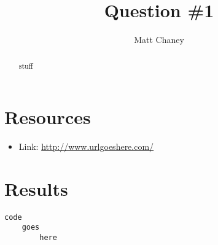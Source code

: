 \documentclass[10pt,letterpaper]{article}
\begin{document}
\lstset{language=Python, basicstyle=\small}

\title{Question \#1}
\author{Matt Chaney}

\maketitle

\begin{abstract}
stuff
\end{abstract}

\section{Resources}
\begin{itemize}
\item Link: \url{http://www.urlgoeshere.com/}

\end{itemize}

\section{Results}
\begin{lstlisting}
code
	goes
		here
\end{lstlisting}
\end{document}
